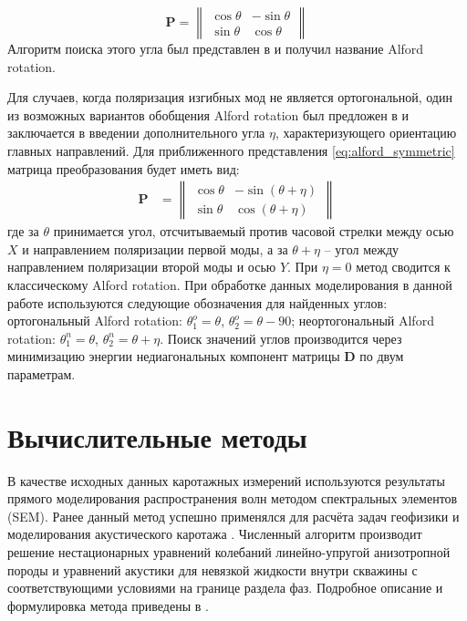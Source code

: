 \documentclass[a4paper,11pt]{article}
\begin{document}
\begin{equation*}
	\mathbf{P} = \left\|
	\begin{array}{cc}
	\cos \theta &-\sin \theta \\ 
	\sin \theta & \cos \theta
	\end{array} 
	\right\| 
\end{equation*}
Алгоритм поиска этого угла был представлен в \cite{Alford1986} и получил название Alford rotation.

Для случаев, когда поляризация изгибных мод не является ортогональной, один из возможных вариантов обобщения Alford rotation был предложен в \cite{Dellinger1998} и заключается в введении дополнительного угла $\eta$, характеризующего ориентацию главных направлений. Для приближенного представления \eqref{eq:alford_symmetric} матрица преобразования будет иметь вид:
\begin{align*}
\mathbf{P} &= \left\|
\begin{array}{cc}
\cos \theta & -\sin (\theta+\eta) \\ 
\sin \theta & \cos (\theta+\eta)
\end{array} 
\right\|
\end{align*}
где за $\theta$ принимается угол, отсчитываемый против часовой стрелки между осью $X$ и направлением поляризации первой моды, а за $\theta + \eta$ -- угол между направлением поляризации второй моды и осью $Y$. При $\eta=0$ метод сводится к классическому Alford rotation. При обработке данных моделирования в данной работе используются следующие обозначения для найденных углов: ортогональный Alford rotation: $\theta_1^o=\theta$, $\theta_2^o=\theta-90$; неортогональный Alford rotation: $\theta_1^n=\theta$, $\theta_2^n=\theta+\eta$. Поиск значений углов производится через минимизацию энергии недиагональных компонент матрицы $\mathbf{D}$ по двум параметрам.


\section{Вычислительные методы}
В качестве исходных данных каротажных измерений используются результаты прямого моделирования распространения волн методом спектральных элементов (SEM). Ранее данный метод успешно применялся для расчёта задач геофизики \cite{Komatitsch1999} и моделирования акустического каротажа \cite{Charara2011}. Численный алгоритм производит решение нестационарных уравнений колебаний линейно-упругой анизотропной породы и уравнений акустики для невязкой жидкости внутри скважины с соответствующими условиями на границе раздела фаз. Подробное описание и формулировка метода приведены в \cite{Komatitsch1999}.
\end{document}
